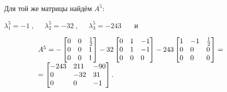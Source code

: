 \bigskip


		Для той же матрицы найдём  $A^5$:



		$\lambda _1^5=-1\;,\;\;\;\;\;\lambda _2^5=-32\;,\;\;\;\;\;\lambda _3^5=-243$ \ \ \ и


\begin{equation*}
\begin{matrix}A^5=-\left[\begin{matrix}0\hfill\null &0\hfill\null &\frac 1 2\hfill\null \\0\hfill\null &0\hfill\null
&1\hfill\null \\0\hfill\null &0\hfill\null &1\hfill\null \end{matrix}\right]-32\left[\begin{matrix}0\hfill\null
&1\hfill\null &-1\hfill\null \\0\hfill\null &1\hfill\null &-1\hfill\null \\0\hfill\null &0\hfill\null &0\hfill\null
\end{matrix}\right]-243\left[\begin{matrix}1\hfill\null &-1\hfill\null &\frac 1 2\hfill\null \\0\hfill\null
&0\hfill\null &0\hfill\null \\0\hfill\null &0\hfill\null &0\hfill\null \end{matrix}\right]=\hfill\null
\\=\left[\begin{matrix}-243\hfill\null &211\hfill\null &-90\hfill\null \\0\hfill\null &-32\hfill\null &31\hfill\null
\\0\hfill\null &0\hfill\null &-1\hfill\null \end{matrix}\right].\hfill\null \end{matrix}\hfill 
\end{equation*}
